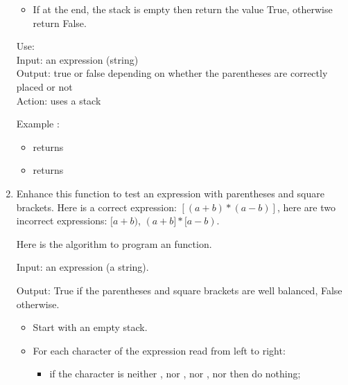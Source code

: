 \documentclass[11pt,class=report,crop=false]{standalone}
\begin{document}
\begin{activite}
\begin{enumerate}
\begin{algorithme}
\begin{itemize}
   \item If at the end, the stack is empty then return the value \og{}True\fg{}, otherwise return \og{}False\fg{}.
   
 \end{itemize}  
   \end{algorithme}


\begin{fonction}
  Use:  \\
  Input: an expression (string) \\
  Output: true or false depending on whether the parentheses are correctly placed or not \\
  Action: uses a stack
   
  \medskip
   
  Example : 
  \begin{itemize}
    \item {} returns 
    \item {} returns 
    \end{itemize}    
\end{fonction}  
  
  
\item Enhance this function to test an expression with parentheses and square brackets.
Here is a correct expression: $[(a+b)*(a-b)]$, here are two incorrect expressions:
$[a+b)$, $(a+b]*[a-b)$.

Here is the algorithm to program an  function.


  \begin{algorithme}
  Input: an expression (a string). 

  Output: \og{}True\fg{} if the parentheses and square brackets are well balanced, \og{}False\fg{} otherwise.     

  \begin{itemize}

  \item Start with an empty stack.   
   
   \item For each character of the expression read from left to right:
   \begin{itemize}
     \item if the character is neither , nor , nor \ci{"["}, nor \ci{"]"} then do nothing;
     

\end{itemize}
\end{itemize}
\end{algorithme}
\end{enumerate}
\end{activite}
\end{document}
